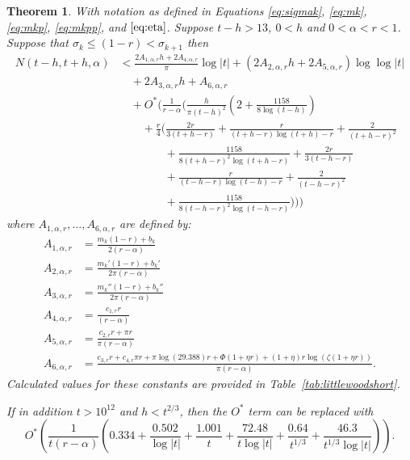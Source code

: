 \documentclass[10pt,english,letter, reqno]{amsart}
\newcommand{\Ostar}{O^{\ast}}
\theoremstyle{plain}
\newtheorem{theorem}{Theorem}
\theoremstyle{definition}
\begin{document}
\begin{theorem}\label{thm:littlewoodshort}
  With notation as defined in Equations \eqref{eq:sigmak}, \eqref{eq:mk}, \eqref{eq:mkp}, \eqref{eq:mkpp}, and $\eqref{eq:eta}$.
  Suppose $t-h>13$, $0<h$ and $0<\alpha<r<1$.
  Suppose that $\sigma_k\leq(1-r) < \sigma_{k+1}$
  then
\begin{align*} N(t-h,t+h,\alpha) &<
\frac{2A_{1,\alpha,r}h + 2A_{4,\alpha,r}}{\pi}\log|t| +(2A_{2,\alpha,r}h  +  2A_{5,\alpha,r})\log\log|t| \\&\quad+2A_{3,\alpha,r}h
 + A_{6,\alpha,r}
\\&\quad+\Ostar\!\Biggl(\frac{1}{r-\alpha} \Biggl(\frac{h}{\pi(t-h)^2}\left(2+\frac{1158}{8\log(t-h)}\right) 
\\&\qquad+ \frac{r}{4}\biggl(
 \frac{2r}{3(t+h-r)} + \frac{r}{(t+h-r)\log(t+h) - r} + \frac{2}{(t+h-r)^2}
 \\&\qquad\qquad+\frac{1158}{8(t+h-r)^2\log(t+h-r)} +\frac{2r}{3(t-h-r)} 
 \\&\qquad\qquad+ \frac{r}{(t-h-r)\log(t-h) - r} + \frac{2}{(t-h-r)^2}
 \\&\qquad\qquad+\frac{1158}{8(t-h-r)^2\log(t-h-r)}
\biggr)\Biggr)\Biggr)
\end{align*}
where $A_{1,\alpha,r},\ldots,A_{6,\alpha,r}$ are defined by: 
\begin{align*}
A_{1,\alpha,r} &= \frac{m_k (1-r) + b_k}{2(r-\alpha)}\\
A_{2,\alpha,r} &= \frac{m_k' (1-r) + b_k'}{2\pi(r-\alpha)} \\
A_{3,\alpha,r} &= \frac{m_k''(1-r) + b_k''}{2\pi(r-\alpha)} \\
A_{4,\alpha,r} &= \frac{c_{1,r}r}{(r-\alpha)} \\
A_{5,\alpha,r} &= \frac{c_{2,r}r + \pi r}{\pi(r-\alpha)}\\
A_{6,\alpha,r} &= \frac{c_{3,r}r+  c_{4,r}\pi r + \pi\log(29.388)r+ \Phi(1+\eta r)  + (1+\eta)r\log(\zeta(1+\eta r))}{\pi(r-\alpha)}.
\end{align*}
Calculated values for these constants are provided in Table~\ref{tab:littlewoodshort}.

If in addition $t>10^{12}$ and  $h<t^{2/3}$, then the $\Ostar$ term can be replaced with
\[
\Ostar\!\left(\frac{1}{t(r-\alpha)}\left(0.334 + \frac{0.502}{\log|t|} + \frac{1.001}{t} + \frac{72.48}{t\log|t|} + \frac{0.64}{t^{1/3}} + \frac{46.3}{t^{1/3}\log|t|}\right)\right) .
\]
%

\end{theorem}
\end{document}
